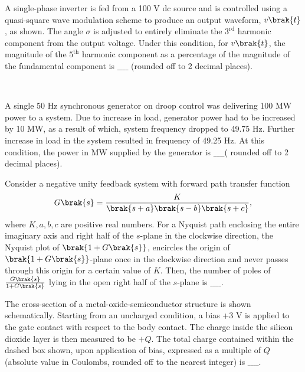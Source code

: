 \item A single-phase inverter is fed from a 100 V dc source and is controlled using a quasi-square wave modulation scheme to produce an output waveform, $v\brak{t}$, as shown. The angle $\sigma$ is adjusted to entirely eliminate the $3^{\text{rd}}$ harmonic component from the output voltage. Under this condition, for $v\brak{t}$, the magnitude of the $5^{\text{th}}$ harmonic component as a percentage of the magnitude of the fundamental component is $\_\_\_\_$ (rounded off to 2 decimal places).
\begin{figure}[!ht]
\centering
\resizebox{0.7\textwidth}{!}{%

}%
\end{figure}\\
\item A single 50 Hz synchronous generator on droop control was delivering 100 MW power to a system. Due to increase in load, generator power had to be increased by 10 MW, as a result of which, system frequency dropped to 49.75 Hz. Further increase in load in the system resulted in frequency of 49.25 Hz.
At this condition, the power in MW supplied by the generator is $\_\_\_\_$( rounded off to 2 decimal places). \\
\item Consider a negative unity feedback system with forward path transfer function 
\begin{align*}
    G\brak{s} = \frac{K}{\brak{s+a}\brak{s-b}\brak{s+c}},
\end{align*}
where $K, a, b, c$ are positive real numbers. For a Nyquist path enclosing the
entire imaginary axis and right half of the $s$-plane in the clockwise direction, the Nyquist plot of $\brak{1 + G\brak{s}}$, encircles the origin of $\brak{1 + G\brak{s}}$-plane once in the clockwise direction and never passes
through this origin for a certain value of $K$. Then, the number of poles of $\frac{G\brak{s}}{1 + G\brak{s}}$ lying in the open right half of the $s$-plane is $\_\_\_\_$. \\
\item The cross-section of a metal-oxide-semiconductor structure is shown schematically. Starting from an uncharged condition, a bias +3 V is applied to the gate contact with respect to the body contact. The charge inside the silicon dioxide layer is then measured to be $+Q$. The total charge contained within the dashed box shown, upon application of bias, expressed as a multiple of $Q$ (absolute value in Coulombs, rounded off to the nearest integer) is $\_\_\_\_$.
\begin{figure}[!ht]
\centering
\resizebox{0.7\textwidth}{!}{%

}%
\end{figure}\\
